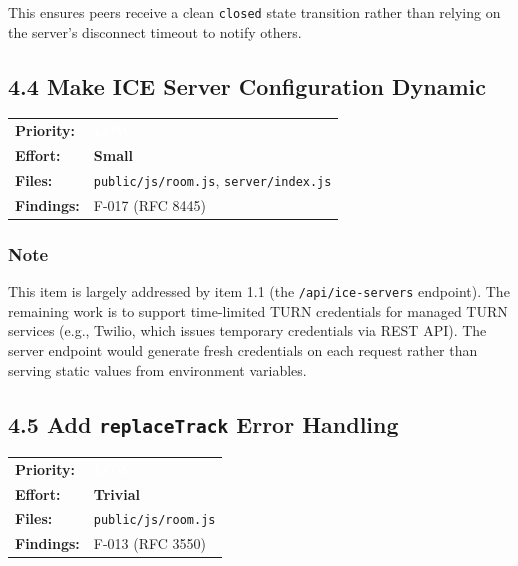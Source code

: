 \documentclass[11pt,letterpaper]{article}
\newcommand{\prilow}{\colorbox{notapplicable}{\textcolor{white}{\small\textbf{LOW}}}}
\newcommand{\efftrivial}{\colorbox{compliant!20}{\small\textbf{Trivial}}}
\newcommand{\effsmall}{\colorbox{compliant!30}{\small\textbf{Small}}}
\begin{document}
This ensures peers receive a clean \texttt{closed} state transition rather than relying on the server's disconnect timeout to notify others.

\subsection{4.4 Make ICE Server Configuration Dynamic}

\begin{tabular}{ll}
\textbf{Priority:} & \prilow \\
\textbf{Effort:} & \effsmall \\
\textbf{Files:} & \texttt{public/js/room.js}, \texttt{server/index.js} \\
\textbf{Findings:} & F-017 (RFC 8445) \\
\end{tabular}

\subsubsection{Note}

This item is largely addressed by item 1.1 (the \texttt{/api/ice-servers} endpoint). The remaining work is to support time-limited TURN credentials for managed TURN services (e.g., Twilio, which issues temporary credentials via REST API). The server endpoint would generate fresh credentials on each request rather than serving static values from environment variables.

\subsection{4.5 Add \texttt{replaceTrack} Error Handling}

\begin{tabular}{ll}
\textbf{Priority:} & \prilow \\
\textbf{Effort:} & \efftrivial \\
\textbf{Files:} & \texttt{public/js/room.js} \\
\textbf{Findings:} & F-013 (RFC 3550) \\
\end{tabular}
\end{document}
